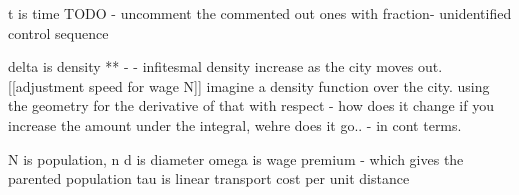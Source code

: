

%  


t is time
TODO - uncomment the commented out ones with fraction- unidentified control sequence

delta is density ** - - infitesmal density increase as the city moves out. [[adjustment speed for wage N]] imagine a density function over the city. 
using the geometry for the derivative of that with respect - how does it change if you increase the amount under the integral, wehre does it go..  - in cont terms.  

N is population, n
d is diameter %
omega is wage premium - which gives  the parented population
tau is linear transport cost per unit distance


